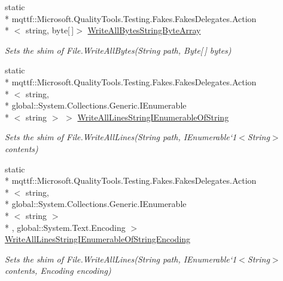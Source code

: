 \begin{DoxyCompactItemize}
static \\*
mqttf\-::\-Microsoft.\-Quality\-Tools.\-Testing.\-Fakes.\-Fakes\-Delegates.\-Action\\*
$<$ string, byte\mbox{[}$\,$\mbox{]}$>$ \hyperlink{class_system_1_1_i_o_1_1_fakes_1_1_shim_file_ab395f40c45c2c9bef3787c10306c5324}{Write\-All\-Bytes\-String\-Byte\-Array}
\begin{DoxyCompactList}\small\item\em Sets the shim of File.\-Write\-All\-Bytes(\-String path, Byte\mbox{[}$\,$\mbox{]} bytes)\end{DoxyCompactList}\item 
static \\*
mqttf\-::\-Microsoft.\-Quality\-Tools.\-Testing.\-Fakes.\-Fakes\-Delegates.\-Action\\*
$<$ string, \\*
global\-::\-System.\-Collections.\-Generic.\-I\-Enumerable\\*
$<$ string $>$ $>$ \hyperlink{class_system_1_1_i_o_1_1_fakes_1_1_shim_file_a8ed5d9c074faed8c6b4b96115178cefb}{Write\-All\-Lines\-String\-I\-Enumerable\-Of\-String}
\begin{DoxyCompactList}\small\item\em Sets the shim of File.\-Write\-All\-Lines(String path, I\-Enumerable`1$<$String$>$ contents)\end{DoxyCompactList}\item 
static \\*
mqttf\-::\-Microsoft.\-Quality\-Tools.\-Testing.\-Fakes.\-Fakes\-Delegates.\-Action\\*
$<$ string, \\*
global\-::\-System.\-Collections.\-Generic.\-I\-Enumerable\\*
$<$ string $>$\\*
, global\-::\-System.\-Text.\-Encoding $>$ \hyperlink{class_system_1_1_i_o_1_1_fakes_1_1_shim_file_aa77d2d80fe056089736b4318a5973624}{Write\-All\-Lines\-String\-I\-Enumerable\-Of\-String\-Encoding}
\begin{DoxyCompactList}\small\item\em Sets the shim of File.\-Write\-All\-Lines(String path, I\-Enumerable`1$<$String$>$ contents, Encoding encoding)\end{DoxyCompactList}\item 

\end{DoxyCompactItemize}
